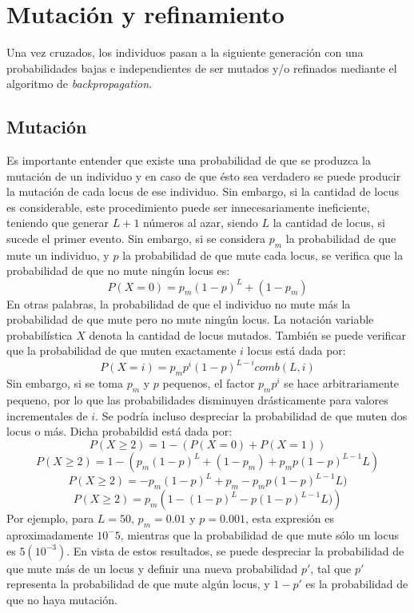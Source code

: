 \documentclass[%
    final,
    reprint,
    notitlepage,
    narroweqnarray,
    inline,
    twoside,
    invited
    ]{ieee}
\begin{document}
\section{Mutación y refinamiento}


\par Una vez cruzados, los individuos pasan a la siguiente generación con una 
probabilidades bajas e independientes de ser mutados y/o refinados 
mediante el algoritmo de \textit{backpropagation}.
\subsection{Mutación}
\par Es importante entender que existe una probabilidad de que se produzca la mutación de
un individuo y en caso de que ésto sea verdadero se puede producir la
mutación de cada locus de ese individuo. Sin embargo, si la cantidad de locus es considerable, 
este procedimiento puede ser innecesariamente ineficiente, teniendo que generar $L+1$ números 
al azar, siendo $L$ la cantidad de locus, si sucede el primer evento. Sin embargo, si se 
considera $p_m$ la probabilidad de que mute un individuo, y $p$ la probabilidad de que mute cada locus, se verifica 
que la probabilidad de que no mute ningún locus es:
\[P(X=0) = p_m(1-p)^{L}+(1-p_m)\]
En otras palabras, la probabilidad de que el individuo no mute más la probabilidad de que mute pero 
no mute ningún locus. La notación variable probabilística $X$ denota la cantidad de locus mutados. 
También se puede verificar que la probabilidad de que muten exactamente $i$ locus está dada por:
\[P(X=i) = p_mp^i(1-p)^{L-i}comb(L,i)\]
Sin embargo, si se toma $p_m$ y $p$ pequenos, el factor $p_mp^i$ se hace arbitrariamente pequeno, por 
lo que las probabilidades disminuyen drásticamente para valores incrementales de $i$. Se podría incluso 
despreciar la probabilidad de que muten dos locus o más. Dicha probabildid está dada por:
\[P(X\ge 2) = 1 - (P(X=0) + P(X=1))\]
\[P(X\ge 2) = 1 - (p_m(1-p)^{L}+(1-p_m) + p_mp(1-p)^{L-1}L)\]
\[P(X\ge 2) = -p_m(1-p)^{L}+p_m - p_mp(1-p)^{L-1}L)\]
\[P(X\ge 2) = p_m\left(1 - (1-p)^{L} - p(1-p)^{L-1}L)\right)\]
Por ejemplo, para $L=50$, $p_m=0.01$ y $p=0.001$, esta expresión es aproximadamente $10^-5$, mientras 
que la probabilidad de que mute sólo un locus es $5(10^{-3})$. En vista de estos resultados, se puede 
 despreciar la probabilidad de que mute más de un locus y definir una nueva probabilidad $p'$, tal que 
 $p'$ representa la probabilidad de que mute algún locus, y $1-p'$ es la probabilidad de que no haya mutación.
\end{document}

